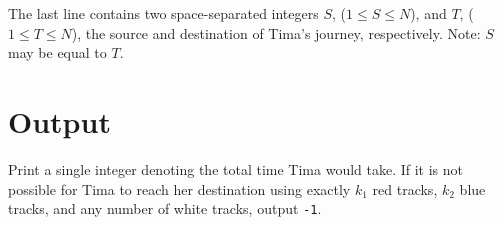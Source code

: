 The last line contains two space-separated integers $S$, ($1 \leq S \leq N$), and $T$, ($1 \leq T \leq N$), the source and destination of Tima's journey, respectively.
Note: $S$ may be equal to $T$.

\section*{Output}
Print a single integer denoting the total time Tima would take. If it is not possible for Tima to reach her destination using exactly $k_1$ red tracks, $k_2$ blue tracks, and any number of white tracks, output \texttt{-1}.
